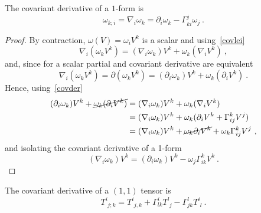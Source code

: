     The covariant derivative of a $1$-form is 
    \begin{equation*}
        \omega_{k;i} = \nabla_i \omega_k = \partial_i \omega_k - \Gamma^j_{ki} \omega_j ~.
    \end{equation*}
    \begin{proof}
        By contraction, $\omega (V) = \omega_i V^k$ is a scalar and using~\eqref{covlei}
        \begin{equation*}
            \nabla_i (\omega_k V^k) = (\nabla_i \omega_k) V^k + \omega_k (\nabla_i V^k) ~,
        \end{equation*}
        and, since for a scalar partial and covariant derivative are equivalent 
        \begin{equation*}
            \nabla_i (\omega_k V^k) = \partial (\omega_k V^k) = (\partial_i \omega_k) V^k + \omega_k (\partial_i V^k) ~.
        \end{equation*}
        Hence, using~\eqref{covder}
        \begin{equation*}
        \begin{aligned}
            (\partial_i \omega_k) V^k + \cancel{\omega_k (\partial_i V^k)} & = (\nabla_i \omega_k) V^k + \omega_k (\nabla_i V^k) \\ & = (\nabla_i \omega_k) V^k + \omega_k (\partial_i V^k + \Gamma^k_{ij} V^j) \\ & = (\nabla_i \omega_k) V^k + \cancel{\omega_k \partial_i V^k} + \omega_k \Gamma^k_{ij} V^j~,
        \end{aligned}
        \end{equation*}
        and isolating the covariant derivative of a 1-form 
        \begin{equation*}
            (\nabla_i \omega_k) V^k = (\partial_i \omega_k) V^k - \omega_j \Gamma^k_{ik} V^k ~.
        \end{equation*}
    \end{proof}
    The covariant derivative of a $(1,1)$ tensor is 
    \begin{equation*}
        T^i_{\phantom i j;k} = T^i_{\phantom i j,k} + \Gamma^i_{lk} T^l_{\phantom l j} - \Gamma^l_{jk} T^i_{\phantom i l} ~.
    \end{equation*}
